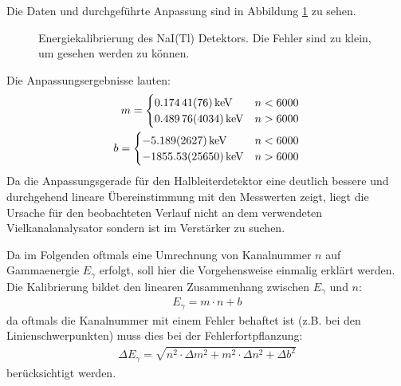 \documentclass[11pt, a4paper]{article}
\numberwithin{equation}{section}
\begin{document}
Die Daten und durchgeführte Anpassung sind in Abbildung \ref{fig:kalibrierung_szinti} zu sehen.
\begin{figure}[ht]
	\centering
	
	\caption{Energiekalibrierung des NaI(Tl) Detektors. Die Fehler sind zu klein, um gesehen werden zu können.}
	\label{fig:kalibrierung_szinti}
\end{figure}
Die Anpassungsergebnisse lauten:
\begin{align}
	m = 
	\begin{cases}
	\SI{0.17441+-0.00076}{\kilo\electronvolt} & n < 6000 \\
	\SI{0.48976+-0.04034}{\kilo\electronvolt} & n > 6000
	\end{cases}\\
	b = 
	\begin{cases}
	\SI{-5.189+-2.627}{\kilo\electronvolt} & n < 6000 \\
	\SI{-1855.53+-256.50}{\kilo\electronvolt} & n > 6000
	\end{cases}
\end{align}
Da die Anpassungsgerade für den Halbleiterdetektor eine deutlich bessere und durchgehend lineare Übereinstimmung mit den Messwerten zeigt, liegt die Ursache für den beobachteten Verlauf nicht an dem verwendeten Vielkanalanalysator sondern ist im Verstärker zu suchen.

Da im Folgenden oftmals eine Umrechnung von Kanalnummer $n$ auf Gammaenergie $E_\gamma$ erfolgt, soll hier die Vorgehensweise einmalig erklärt werden.
Die Kalibrierung bildet den linearen Zusammenhang zwischen $E_\gamma$ und $n$:
\begin{align}
	E_\gamma = m \cdot n + b
\end{align}
da oftmals die Kanalnummer mit einem Fehler behaftet ist (z.B. bei den Linienschwerpunkten) muss dies bei der Fehlerfortpflanzung:
\begin{align}
	\Delta E_\gamma = \sqrt{n^2 \cdot \Delta m^2 + m^2 \cdot \Delta n^2 + \Delta b^2}
\end{align}
berücksichtigt werden.
\end{document}
